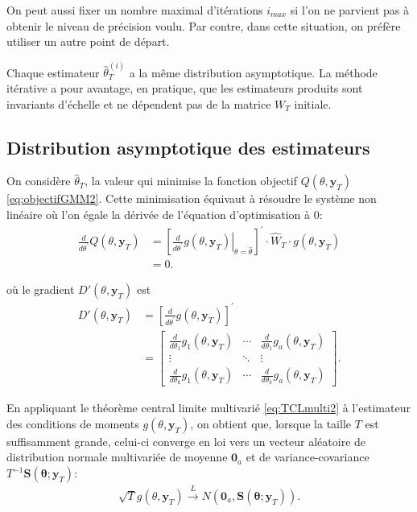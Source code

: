 On peut aussi fixer un nombre maximal d'itérations $i_{max}$ si l'on
ne parvient pas à obtenir le niveau de précision voulu. Par contre,
dans cette situation, on préfère utiliser un autre point de départ.

Chaque estimateur $\hat{\theta}_T^{(i)}$ a la même distribution
asymptotique. La méthode itérative a pour avantage, en pratique, que
les estimateurs produits sont invariants d'échelle et ne dépendent pas
de la matrice $W_T$ initiale.

\subsection{Distribution asymptotique des estimateurs}
\label{sec:matvcovGMM}

On considère $\hat{\theta}_T$, la valeur qui minimise la fonction
objectif $Q(\theta,\mathbf{y}_{T})$ \eqref{eq:objectifGMM2}. Cette
minimisation équivaut à résoudre le système non linéaire où l'on égale
la dérivée de l'équation d'optimisation à 0:
\begin{align} \label{eq:premierordreGMM}
  \frac{d}{d\theta^{\prime}}Q(\theta,\mathbf{y}_{T}) &=
  \left[\left.\frac{d}{d\theta^{\prime}}g(\theta,\mathbf{y}_{T})\right|_{\theta=\hat{\theta}}
  \right]^{\prime} \cdot \hat{W}_T \cdot g(\theta,\mathbf{y}_{T}) \\
  &= 0. \nonumber
\end{align}

où le gradient $D'(\theta,\mathbf{y}_{T})$ est
\begin{align} \label{eq:gradientGMM} D'(\theta,\mathbf{y}_{T}) &=
  \left[\frac{d}{d\theta^{\prime}}g(\theta,\mathbf{y}_{T})
  \right]^{\prime} \nonumber\\
  &= \begin{bmatrix}
    \frac{d}{d\theta_1}g_1(\theta,\mathbf{y}_{T})& \cdots & \frac{d}{d\theta_1}g_a(\theta,\mathbf{y}_{T}) \\
    \vdots & \ddots & \vdots \\
    \frac{d}{d\theta_k}g_1(\theta,\mathbf{y}_{T})& \cdots &
    \frac{d}{d\theta_k}g_a(\theta,\mathbf{y}_{T})
  \end{bmatrix}.
\end{align}

En appliquant le théorème central limite multivarié
\eqref{eq:TCLmulti2} à l'estimateur des conditions de moments
$g(\theta,\mathbf{y}_{T})$, on obtient que, lorsque la taille $T$ est
suffisamment grande, celui-ci converge en loi vers un vecteur
aléatoire de distribution normale multivariée de moyenne
$\mathbf{0}_a$ et de variance-covariance
$T^{-1}\mathbf{S}(\mathbf{\theta};\mathbf{y}_T)$:
\begin{align}
  \label{eq:TCL-GMM}
  \sqrt{T} g(\theta,\mathbf{y}_{T}) \stackrel{L}{\longrightarrow}
  N\left(\mathbf{0}_a,\mathbf{S}(\mathbf{\theta};\mathbf{y}_T)\right).
\end{align}

